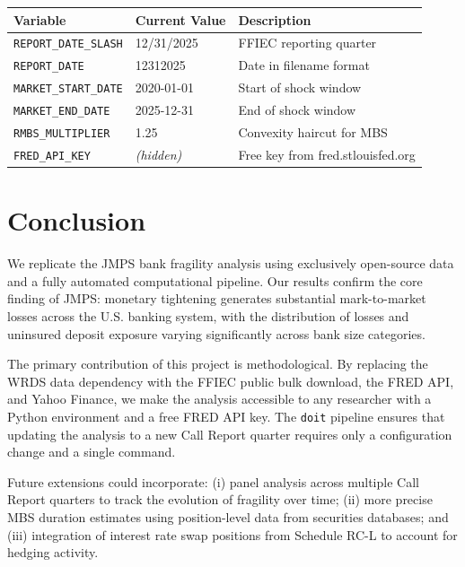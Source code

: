 \documentclass[12pt, a4paper]{article}
\begin{document}
\begin{center}
\begin{tabular}{lll}
\toprule
Variable & Current Value & Description \\
\midrule
\texttt{REPORT\_DATE\_SLASH} & 12/31/2025 & FFIEC reporting quarter \\
\texttt{REPORT\_DATE}        & 12312025     & Date in filename format \\
\texttt{MARKET\_START\_DATE} & 2020-01-01 & Start of shock window \\
\texttt{MARKET\_END\_DATE}   & 2025-12-31   & End of shock window \\
\texttt{RMBS\_MULTIPLIER}    & 1.25   & Convexity haircut for MBS \\
\texttt{FRED\_API\_KEY}      & \textit{(hidden)} & Free key from fred.stlouisfed.org \\
\bottomrule
\end{tabular}
\end{center}

\section{Conclusion}
\label{sec:conclusion}

We replicate the JMPS bank fragility analysis using exclusively open-source data
and a fully automated computational pipeline. Our results confirm the core finding
of JMPS: monetary tightening generates substantial mark-to-market losses across
the U.S. banking system, with the distribution of losses and uninsured deposit
exposure varying significantly across bank size categories.

The primary contribution of this project is methodological. By replacing the
WRDS data dependency with the FFIEC public bulk download, the FRED API, and
Yahoo Finance, we make the analysis accessible to any researcher with a Python
environment and a free FRED API key. The \texttt{doit} pipeline ensures that
updating the analysis to a new Call Report quarter requires only a configuration
change and a single command.

Future extensions could incorporate: (i) panel analysis across multiple Call
Report quarters to track the evolution of fragility over time; (ii) more precise
MBS duration estimates using position-level data from securities databases; and
(iii) integration of interest rate swap positions from Schedule RC-L to account
for hedging activity.
\end{document}
